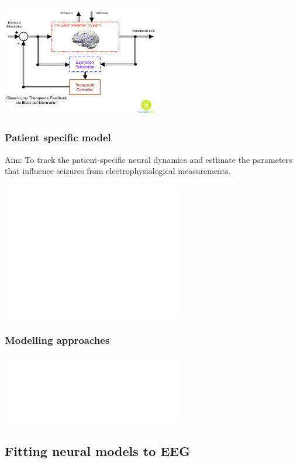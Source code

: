 \documentclass[compress]{beamer}
\begin{document}
\begin{frame}
	\begin{center}
		\includegraphics[height=5cm]{./Figures/StimulationSeizureControl.pdf}	
	\end{center}	
\end{frame}

\begin{frame}\frametitle{Patient specific model}
	Aim: To track the patient-specific neural dynamics and estimate the parameters that influence seizures from electrophysiological measurements. 
	\begin{center}
		\includegraphics<1>[height=6cm]{./Figures/BrainElectrode.pdf} 
	\end{center}
\end{frame}

\begin{frame}\frametitle{Modelling approaches} 
	\begin{center}
		\includegraphics<1>[height=3cm]{./Figures/ModellingApproaches.pdf} 
	\end{center}
\end{frame}
\subsection{Fitting neural models to EEG}

\end{document}
